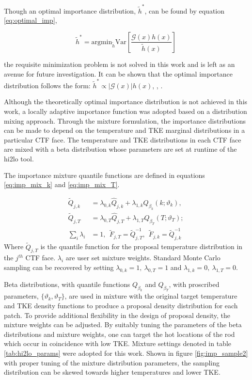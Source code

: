 Though an optimal importance distribution, $\tilde{h}^* $, can be found by equation \ref{eq:optimal_imp},

\begin{equation}
\tilde{h}^* = \mathrm{argmin}_{\tilde{h}}\mathrm{Var} \left[ \frac{\mathcal{G}(x)h(x)}{\tilde{h}(x)} \right] 
\label{eq:optimal_imp}
\end{equation}

the requisite minimization problem is not solved in this work and is left as an avenue for future investigation. It can be shown that the optimal importance distribution follows the form: $\tilde{h}^* \propto |\mathcal{G}(x)|h(x)$, \cite{rubinstein2011}, \cite{mcbook}.

Although the theoretically optimal importance distribution is not achieved in this work, a locally adaptive importance function was adopted based on a distribution mixing approach.  Through the mixture formulation, the importance distributions can be made to depend on the temperature and TKE marginal distributions in a particular CTF face.  The temperature and TKE distributions in each CTF face are mixed with a beta distribution whose parameters are set at runtime of the hi2lo tool.  

The importance  mixture quantile functions are defined in equations \ref{eq:imp_mix_k} and \ref{eq:imp_mix_T}.

\begin{align}
\tilde Q_{j,k} &= \lambda_{0,k} \hat Q_{j,k}  + \lambda_{1,k} Q_{\beta_k}(k; \vartheta_k),  \label{eq:imp_mix_k} \\
\tilde Q_{j,T} &= \lambda_{0,T} \hat Q_{j,T}  + \lambda_{1,T} Q_{\beta_T}(T; \vartheta_T);  \label{eq:imp_mix_T} \\
\sum_i \lambda_i &= 1, \ \ \tilde F_{j,T} = \tilde Q^{-1}_{j,T},\ \  \tilde F_{j,k} = \tilde Q^{-1}_{j,k}
\end{align}
Where $\tilde Q_{j,T}$ is the quantile function for the proposal temperature distribution in the $j^{th}$ CTF face. $\lambda_i$ are user set mixture weights. Standard Monte Carlo sampling can be recovered by setting $\lambda_{0,k}=1,\ \lambda_{0,T}=1$ and  $\lambda_{1,k}=0,\ \lambda_{1,T}=0$.

Beta distributions, with quantile functions $Q_{\beta_k}$ and $Q_{\beta_T}$,  with proscribed parameters, $\{ \vartheta_k, \vartheta_T \}$, are used in mixture with the original target temperature and TKE density functions to produce a proposal density distribution for each patch.  To provide additional flexibility in the design of proposal density, the mixture weights can be adjusted. By suitably tuning the parameters of the beta distributions and mixture weights, one can target the hot locations of the rod which occur in coincidence with low TKE.  Mixture settings denoted in table \ref{tab:hi2lo_params} were adopted for this work.  Shown in figure \ref{fig:imp_sample2} with proper tuning of the mixture distribution parameters, the sampling distribution can be skewed towards higher temperatures and lower TKE.

